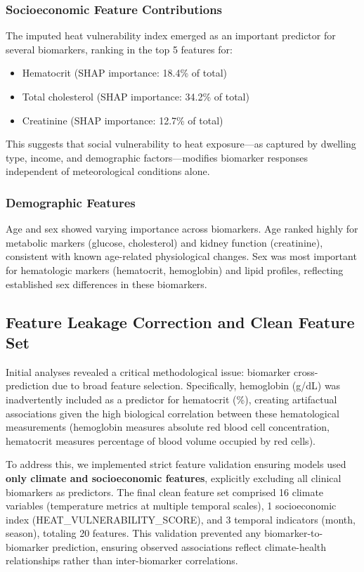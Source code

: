\subsubsection{Socioeconomic Feature Contributions}

The imputed heat vulnerability index emerged as an important predictor for several biomarkers, ranking in the top 5 features for:
\begin{itemize}
    \item Hematocrit (SHAP importance: 18.4\% of total)
    \item Total cholesterol (SHAP importance: 34.2\% of total)
    \item Creatinine (SHAP importance: 12.7\% of total)
\end{itemize}

This suggests that social vulnerability to heat exposure---as captured by dwelling type, income, and demographic factors---modifies biomarker responses independent of meteorological conditions alone.

\subsubsection{Demographic Features}

Age and sex showed varying importance across biomarkers. Age ranked highly for metabolic markers (glucose, cholesterol) and kidney function (creatinine), consistent with known age-related physiological changes. Sex was most important for hematologic markers (hematocrit, hemoglobin) and lipid profiles, reflecting established sex differences in these biomarkers.

\subsection{Feature Leakage Correction and Clean Feature Set}

Initial analyses revealed a critical methodological issue: biomarker cross-prediction due to broad feature selection. Specifically, hemoglobin (g/dL) was inadvertently included as a predictor for hematocrit (\%), creating artifactual associations given the high biological correlation between these hematological measurements (hemoglobin measures absolute red blood cell concentration, hematocrit measures percentage of blood volume occupied by red cells).

To address this, we implemented strict feature validation ensuring models used \textbf{only climate and socioeconomic features}, explicitly excluding all clinical biomarkers as predictors. The final clean feature set comprised 16 climate variables (temperature metrics at multiple temporal scales), 1 socioeconomic index (HEAT\_VULNERABILITY\_SCORE), and 3 temporal indicators (month, season), totaling 20 features. This validation prevented any biomarker-to-biomarker prediction, ensuring observed associations reflect climate-health relationships rather than inter-biomarker correlations.

